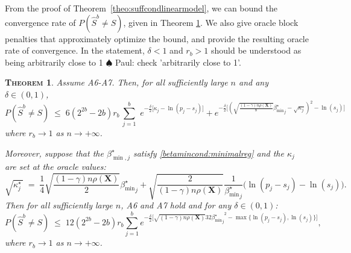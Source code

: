 \documentclass[aos]{imsart}
\theoremstyle{plain}
\newtheorem{thm}{\textsc{Theorem}}[section]
\newcommand{\paul}[1]{{\small{\color{green} \sf $\spadesuit$ Paul: #1}}}
\newcommand{\bs}{\boldsymbol}
\begin{document}
From the proof of Theorem~\ref{theo:suffcondlinearmodel}, we can bound the convergence rate of $P(\hat S^{b}\neq S)$, given in Theorem \ref{prop:fullrecovreg}. We also give oracle block penalties that approximately optimize the bound, and provide the resulting oracle rate of convergence. 
In the statement, $\delta<1$ and $r_b>1$ should be understood as being arbitrarily close to 1 \paul{check 'arbitrarily close to 1'}.
\begin{thm}\label{prop:fullrecovreg}
Assume A6-A7. Then, for all sufficiently large $n$ and any $\delta \in (0,1)$,
\begin{equation}\label{eq:rateconvreg}
 P(\hat{S}^{b} \neq S)\;\leq\; 6(2^{2b}-2b)r_b\,\sum_{j=1}^b\,\, e^{-\tfrac{\delta}{2}\big[\kappa_j-\ln(p_j-s_j)\big]} + 
    e^{-\tfrac{\delta}{2}\big[(\sqrt{\frac{(1-\gamma) n\rho(\bs X)}{8}}{{\beta_{\min}^{\star}}_j} - \sqrt{\kappa_j})^2 -\ln(s_j) \big]}
\end{equation}
where $r_b\to 1$ as $n\to +\infty$.

Moreover, suppose that the $\beta^\star_{\min,j}$ satisfy \eqref{betamincond:minimalreg} and the $\kappa_j$ are set at the oracle values:
	\begin{equation} \label{eq:oraclepenreg}
\sqrt{\kappa^\star_j\,} \;=\; \frac14\sqrt{\frac{(1-\gamma) n\rho(\bs X)}{2}}{{\beta_{\min}^{\star}}_j}+\sqrt{\frac{2}{(1-\gamma) n\rho(\bs X)}}\frac{1}{{\beta_{\min}^{\star}}_j}\big(\ln({p_j-s_j})-\ln({s_j})\big).
\end{equation}
Then for all sufficiently large $n$, A6 and A7 hold and for any $\delta \in (0,1)$: 
\begin{equation}\label{eq:oraclerateconvreg}
    P(\hat{S}^{b} \neq S) \; \leq \; 12(2^{2b}-2b)r_b \sum_{j=1}^b e^{-\tfrac{\delta}{2}\big[\sqrt{(1-\gamma) n\rho(\bs X)}{32}{{\beta_{\min}^{\star}}_j}^2-\max\{\ln(p_j-s_j),\ln(s_j)\}\big]},
\end{equation}
where $r_b\to 1$ as $n\to+\infty$.
\end{thm}
\end{document}
